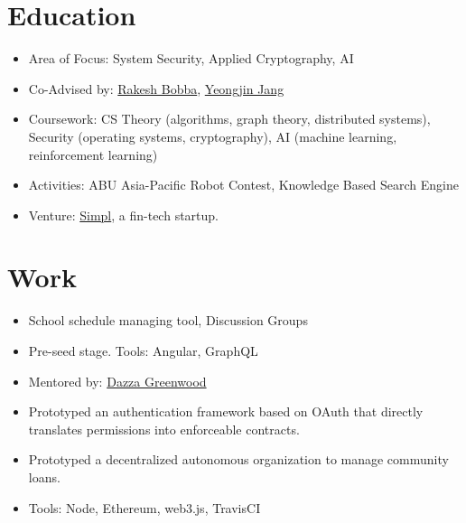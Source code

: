 \documentclass[11pt,a4paper,sans]{moderncv}
\begin{document}
\section{Education}
{
    \begin{itemize}
    \item Area of Focus: System Security, Applied Cryptography, AI
    \item Co-Advised by:
    \href{https://eecs.oregonstate.edu/people/bobba-rakesh}{Rakesh Bobba},
    \href{https://www.unexploitable.systems/}{Yeongjin Jang}
    \item Coursework: CS Theory (algorithms, graph theory, distributed systems),
    Security (operating systems, cryptography), AI (machine
    learning, reinforcement learning)
    \end{itemize}
}
{
    \begin{itemize}
    \item Activities: ABU Asia-Pacific Robot Contest, Knowledge Based Search
    Engine
    \item Venture: \href{https://www.getsimpl.com}{Simpl}, a fin-tech startup.
    \end{itemize}
}

\section{Work}
{
    \begin{itemize}
        \item School schedule managing tool, Discussion Groups
        \item Pre-seed stage. Tools: Angular, GraphQL
    \end{itemize}
}

{
    \begin{itemize}
    \item Mentored by: \href{https://web.media.mit.edu/~dang/}{Dazza Greenwood}
    \item Prototyped an authentication framework based on OAuth that directly
    translates permissions into enforceable contracts.
    \item Prototyped a decentralized autonomous organization to manage community
        loans.
    \item Tools: Node, Ethereum, web3.js, TravisCI
    \end{itemize}
}
\end{document}
